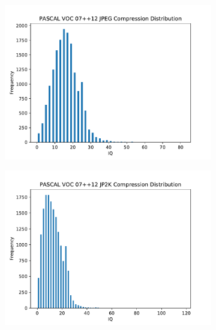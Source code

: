 \begin{figure}[H]
\begin{subfigure}[b]{0.4\textwidth}
        \caption{}\label{fig:dist_gb}
    \end{subfigure}
    \begin{subfigure}[b]{0.4\textwidth}
        \center
        \includegraphics[width=\textwidth]{Figs/Implementation/JPEGCompressiondist.pdf}
        \caption{}\label{fig:dist_jp}
    \end{subfigure}
    \begin{subfigure}[b]{0.4\textwidth}
        \center
        \includegraphics[width=\textwidth]{Figs/Implementation/JP2KCompressiondist.pdf}
        \caption{}\label{fig:dist_jk}
    \end{subfigure}
  	\begin{subfigure}[b]{0.4\textwidth}

\end{subfigure}
\end{figure}
